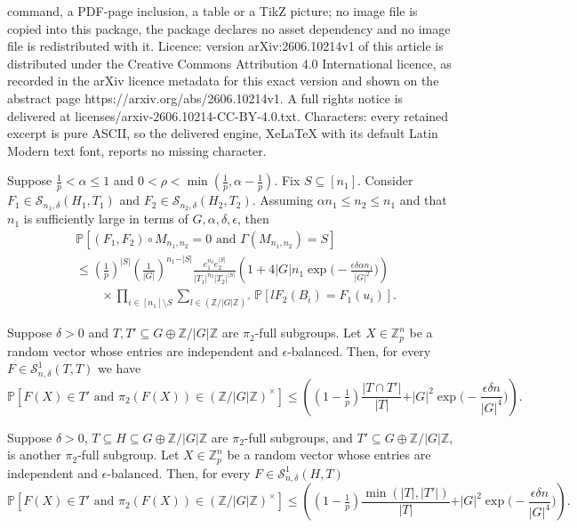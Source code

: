 \documentclass[10pt,a4paper]{amsart}
\newcommand{\Mnot}{M_{n_1,n_2}}
\newcommand{\PPP}{\mathbb{P}}
\newcommand{\SSO}[3]{\mathcal{S}^1_{#1}(#2,#3)}
\newcommand{\SSS}[3]{\mathcal{S}_{#1}(#2,#3)}
\newcommand{\Z}{\mathbb{Z}}
\newcommand{\ZG}{\Z/\abs{G}\Z}
\newcommand{\Zp}{\Z_p}
\newcommand{\abs}[1]{\vert#1\vert}
\begin{document}
command, a PDF-page inclusion, a table or a TikZ picture; no image file is copied into this package, the package declares no asset dependency and no image file is redistributed with it. Licence: version arXiv:2606.10214v1 of this article is distributed under the Creative Commons Attribution 4.0 International licence, as recorded in the arXiv licence metadata for this exact version and shown on the abstract page https://arxiv.org/abs/2606.10214v1. A full rights notice is delivered at licenses/arxiv-2606.10214-CC-BY-4.0.txt. Characters: every retained excerpt is pure ASCII, so the delivered engine, XeLaTeX with its default Latin Modern text font, reports no missing character.
\begin{lemma}\label{Lem: depth prob intermediate}
Suppose $\frac{1}{p}<\alpha\leq 1$ and $0<\rho<\min(\frac{1}{p},\alpha-\frac{1}{p})$.
Fix $S\subseteq [n_1]$.
Consider $F_1\in \SSS{n_1,\delta}{H_1}{T_1}$ and $F_2\in \SSS{n_2,\delta}{H_2}{T_2}$.
Assuming $\alpha n_1\leq n_2\leq n_1$ and that $n_1$ is sufficiently large in terms of $G, \alpha,\delta, \epsilon$, then
\begin{align*}
&\PPP[(F_1,F_2)\circ \Mnot=0 \text{ and }\Gamma(\Mnot)=S]\\
&\leq (\tfrac{1}{p})^{\abs{S}} (\tfrac{1}{\abs{G}})^{n_1-\abs{S}}
\frac{e_1^{n_2} e_2^{\abs{S}}}{\abs{T_1}^{n_2} \abs{T_2}^{\abs{S}}}
\left(1+4\abs{G}n_1 \exp\Big(-\frac{\epsilon \delta \alpha n_1}{|G|^2}\Big) \right)\\
&\quad\quad\times \prod_{i\in [n_1]\setminus S} \sum_{l\in (\Z/\abs{G}\Z)^{\times}} \PPP[l F_2(B_i)= F_1(u_i)].
\end{align*}
\end{lemma}

\begin{lemma}\label{Lem: bound subgroup, pi_2 full, code}
Suppose $\delta>0$ and $T, T'\subseteq G\oplus\ZG$ are $\pi_2$-full subgroups.
Let $X\in\Zp^n$ be a random vector whose entries are independent and $\epsilon$-balanced.
Then, for every $F\in\SSO{n,\delta}{T}{T}$ we have
\[
\PPP[F(X)\in T' \text{ and } \pi_2(F(X))\in (\ZG)^{\times}]
\leq 
 \left( (1-\tfrac{1}{p}) \frac{\abs{T\cap T'}}{\abs{T}}
 +\abs{G}^2\exp\Big(-\frac{\epsilon\delta n}{|G|^4}\Big) \right).
\]
\end{lemma}

\begin{lemma}\label{Lem: bound subgroup, pi_2 full, depth}
Suppose $\delta>0$, $T\subseteq H\subseteq G\oplus\ZG$ are $\pi_2$-full subgroups, and $T'\subseteq G\oplus \ZG$, is another $\pi_2$-full subgroup.
Let $X\in\Zp^n$ be a random vector whose entries are independent and $\epsilon$-balanced.
Then, for every $F\in\SSO{n,\delta}{H}{T}$
\[
\PPP[F(X)\in T' \text{ and } \pi_2(F(X))\in (\ZG)^{\times}]
\leq 
 \left( (1-\tfrac{1}{p}) \frac{\min(\abs{T},\abs{T'})}{\abs{T}}
 +\abs{G}^2\exp\Big(-\frac{\epsilon\delta n}{|G|^4}\Big) \right).
\]
\end{lemma}
\end{document}
